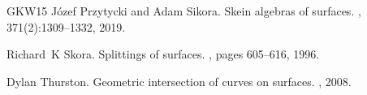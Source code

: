 \documentclass[11pt]{amsart}
\numberwithin{theorem}{section}
\theoremstyle{definition}
\theoremstyle{remark}
\newcommand{\<}{\langle}
\renewcommand{\>}{\rangle}
\begin{document}
\begin{thebibliography}{GKW15}
J{\'o}zef Przytycki and Adam Sikora.
\newblock Skein algebras of surfaces.
, 371(2):1309--1332, 2019.

Richard~K Skora.
\newblock Splittings of surfaces.
, pages 605--616, 1996.

Dylan Thurston.
\newblock Geometric intersection of curves on surfaces.
, 2008.

\end{thebibliography}
\end{document}
